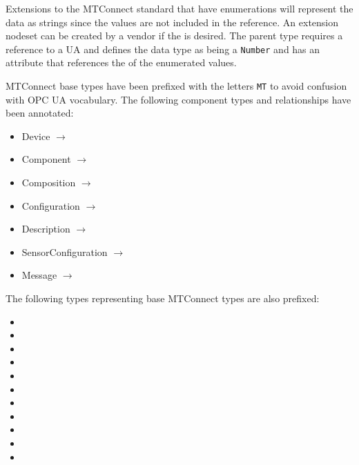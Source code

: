 Extensions to the MTConnect standard that have enumerations will represent the data as strings since the values are not included in the  reference. An extension nodeset can be created by a vendor if the  is desired. The parent type requires a reference to a UA  and defines the data type as being a \texttt{Number} and has an attribute that references the  of the enumerated values.

MTConnect base types have been prefixed with the letters \texttt{MT} to avoid confusion with OPC UA vocabulary. The following component types and relationships have been annotated:

\begin{itemize}
\item Device $\rightarrow$ 
\item Component $\rightarrow$  
\item Composition $\rightarrow$ 
\item Configuration $\rightarrow$ 
\item Description $\rightarrow$ 
\item SensorConfiguration $\rightarrow$ 
\item Message $\rightarrow$ 
\end{itemize}

The following types representing base MTConnect types are also prefixed:

\begin{itemize}
\item {}
\item {}
\item {}
\item {}
\item {}
\item {}
\item {}
\item {}
\item {}
\item {}
\item {}
\end{itemize}

